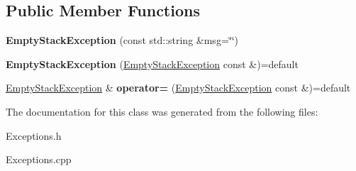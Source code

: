 \subsection*{Public Member Functions}
\begin{DoxyCompactItemize}
\item 
\mbox{\label{classantlr4_1_1EmptyStackException_a0d72af7b155cf625bb078211df68f3f1}} 
{\bfseries Empty\+Stack\+Exception} (const std\+::string \&msg=\char`\"{}\char`\"{})
\item 
\mbox{\label{classantlr4_1_1EmptyStackException_a46c40463aaa90db612bdbc8cc4f8290b}} 
{\bfseries Empty\+Stack\+Exception} (\hyperlink{classantlr4_1_1EmptyStackException}{Empty\+Stack\+Exception} const \&)=default
\item 
\mbox{\label{classantlr4_1_1EmptyStackException_abb155a661cf8cb57fdb7dc66743acf3c}} 
\hyperlink{classantlr4_1_1EmptyStackException}{Empty\+Stack\+Exception} \& {\bfseries operator=} (\hyperlink{classantlr4_1_1EmptyStackException}{Empty\+Stack\+Exception} const \&)=default
\end{DoxyCompactItemize}


The documentation for this class was generated from the following files\+:\begin{DoxyCompactItemize}
\item 
Exceptions.\+h\item 
Exceptions.\+cpp\end{DoxyCompactItemize}
